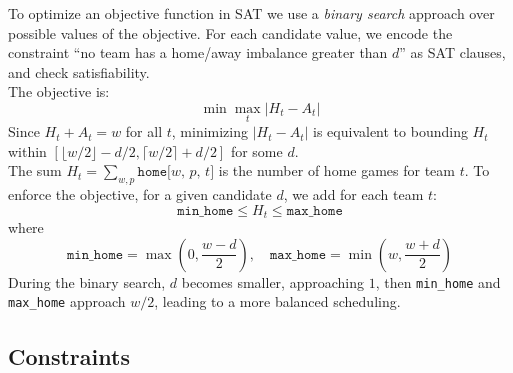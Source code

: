 \documentclass[11pt]{article}
\begin{document}
To optimize an objective function in SAT we use a \emph{binary search} approach over possible values of the objective. For each candidate value, we encode the constraint ``no team has a home/away imbalance greater than $d$'' as SAT clauses, and check satisfiability.
\\The objective is:
\[
\min \max_{t} |H_t - A_t|
\]
Since $H_t + A_t = w$ for all $t$, minimizing $|H_t - A_t|$ is equivalent to bounding $H_t$ within $[\lfloor w/2 \rfloor - d/2, \lceil w/2 \rceil + d/2]$ for some $d$.
\\
The sum $H_t = \sum_{w,p} \texttt{home[$w$, $p$, $t$]}$ is the number of home games for team $t$.
To enforce the objective, for a given candidate $d$, we add for each team $t$:
\[
\texttt{min\_home} \leq H_t \leq \texttt{max\_home}
\]
where
\[
\texttt{min\_home} = \max\left(0, \frac{w - d}{2}\right), \quad
\texttt{max\_home} = \min\left(w, \frac{w + d}{2}\right)
\]
During the binary search, $d$ becomes smaller, approaching $1$, then \texttt{min\_home} and \texttt{max\_home} approach $w/2$, leading to a more balanced scheduling.

\subsection{Constraints}
\end{document}

